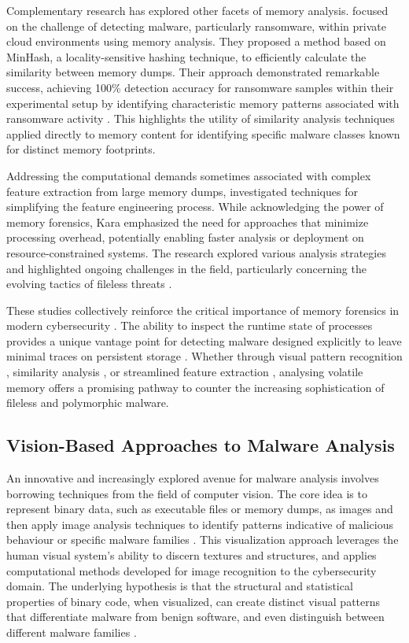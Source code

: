 Complementary research has explored other facets of memory analysis. \citet{nissim2019volatile} focused on the challenge of detecting malware, particularly ransomware, within private cloud environments using memory analysis. They proposed a method based on MinHash, a locality-sensitive hashing technique, to efficiently calculate the similarity between memory dumps. Their approach demonstrated remarkable success, achieving 100\% detection accuracy for ransomware samples within their experimental setup by identifying characteristic memory patterns associated with ransomware activity \citep{nissim2019volatile}. This highlights the utility of similarity analysis techniques applied directly to memory content for identifying specific malware classes known for distinct memory footprints.

Addressing the computational demands sometimes associated with complex feature extraction from large memory dumps, \citet{kara2022fileless} investigated techniques for simplifying the feature engineering process. While acknowledging the power of memory forensics, Kara emphasized the need for approaches that minimize processing overhead, potentially enabling faster analysis or deployment on resource-constrained systems. The research explored various analysis strategies and highlighted ongoing challenges in the field, particularly concerning the evolving tactics of fileless threats \citep{kara2022fileless}.

These studies collectively reinforce the critical importance of memory forensics in modern cybersecurity \citep{sihwail2019malware}. The ability to inspect the runtime state of processes provides a unique vantage point for detecting malware designed explicitly to leave minimal traces on persistent storage \citep{sihag2021assistive, dai2018malware}. Whether through visual pattern recognition \citep{bozkir2021catch}, similarity analysis \citep{nissim2019volatile}, or streamlined feature extraction \citep{kara2022fileless}, analysing volatile memory offers a promising pathway to counter the increasing sophistication of fileless and polymorphic malware.


\subsection{Vision-Based Approaches to Malware Analysis}
\label{subsec:vision_based}

An innovative and increasingly explored avenue for malware analysis involves borrowing techniques from the field of computer vision. The core idea is to represent binary data, such as executable files or memory dumps, as images and then apply image analysis techniques to identify patterns indicative of malicious behaviour or specific malware families \citep{nataraj2011malware, bozkir2021catch}. This visualization approach leverages the human visual system's ability to discern textures and structures, and applies computational methods developed for image recognition to the cybersecurity domain. The underlying hypothesis is that the structural and statistical properties of binary code, when visualized, can create distinct visual patterns that differentiate malware from benign software, and even distinguish between different malware families \citep{nataraj2011malware}.

